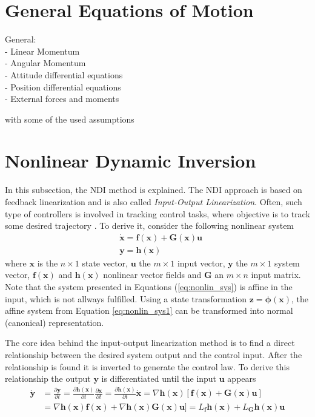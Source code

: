 \documentclass[11pt, a4paper, twoside]{report}
\begin{document}
\section{General Equations of Motion} \label{sec:eqs_motion}
General: \\
- Linear Momentum\\
- Angular Momentum\\
- Attitude differential equations\\
- Position differential equations\\
- External forces and moments

with some of the used assumptions

\section{Nonlinear Dynamic Inversion} \label{sec:ndi}

In this subsection, the \acrfull{NDI} method is explained. The \acrshort{NDI} approach is based on feedback linearization and is also called \textit{Input-Output Linearization}. Often, such type of controllers is involved in tracking control tasks, where objective is to track some desired trajectory \cite{Slotine}. To derive it, consider the following nonlinear system
\begin{subequations}
	\begin{align}
		&\bm{\dot{x}} = \bm{f(x)} + \bm{G(x)}\bm{u} \label{eq:nonlin_sys1} \\
		&\bm{y} = \bm{h(x)} \label{eq:nonlin_sys2}
	\end{align}
	\label{eq:nonlin_sys}
\end{subequations}
where $\bm{x}$ is the $n\times1$ state vector, $\bm{u}$ the $m\times1$ input vector, $\bm{y}$ the $m\times1$ system vector, $\bm{f(x)}$ and $\bm{h(x)}$ nonlinear vector fields and $\bm{G}$ an $m\times n$ input matrix. Note that the system presented in Equations (\ref{eq:nonlin_sys}) is affine in the input, which is not allways fulfilled. Using a state transformation $\bm{z = \phi(x)}$, the affine system from Equation \ref{eq:nonlin_sys1} can be transformed into normal (canonical) representation. 

The core idea behind the input-output linearization method is to find a direct relationship between the desired system output and the control input. After the relationship is found it is inverted to generate the control law. To derive this relationship the output $\bm{y}$ is differentiated until the input $\bm{u}$ appears
\begin{equation}
	\begin{split}
		\dot{\bm{y}} &=  \frac{\partial\bm{y}}{\partial t} = \frac{\partial\bm{h(x)}}{\partial t} \frac{\partial\bm{x}}{\partial t} = \frac{\partial\bm{h(x)}}{\partial t} \dot{\bm{x}} = \nabla\bm{h(x)} [\bm{f(x)} + \bm{G(x)}\bm{u}] \\
		&= \nabla\bm{h(x)} \bm{f(x)} + \nabla\bm{h(x)} \bm{G(x)}\bm{u}] = L_{\bm{f}} \bm{h(x)} + L_{\bm{G}} \bm{h(x) u} 
		\label{eq:dy}
	\end{split}
\end{equation}
\end{document}
